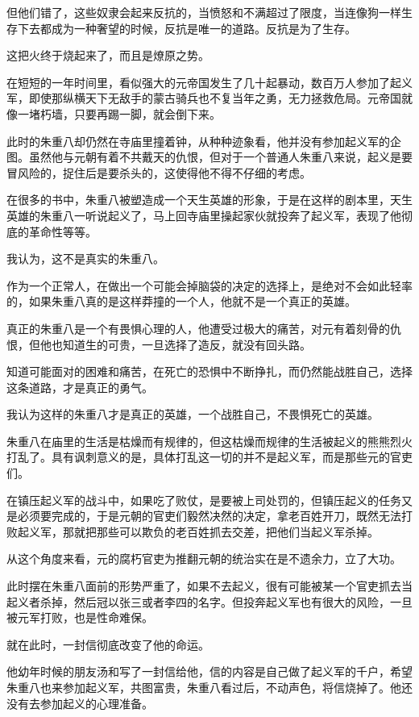 \begin{multicols}{\theparacolNo}
		但他们错了，这些奴隶会起来反抗的，当愤怒和不满超过了限度，当连像狗一样生存下去都成为一种奢望的时候，反抗是唯一的道路。反抗是为了生存。

		这把火终于烧起来了，而且是燎原之势。

		在短短的一年时间里，看似强大的元帝国发生了几十起暴动，数百万人参加了起义军，即使那纵横天下无敌手的蒙古骑兵也不复当年之勇，无力拯救危局。元帝国就像一堵朽墙，只要再踢一脚，就会倒下来。

		此时的朱重八却仍然在寺庙里撞着钟，从种种迹象看，他并没有参加起义军的企图。虽然他与元朝有着不共戴天的仇恨，但对于一个普通人朱重八来说，起义是要冒风险的，捉住后是要杀头的，这使得他不得不仔细的考虑。

		在很多的书中，朱重八被塑造成一个天生英雄的形象，于是在这样的剧本里，天生英雄的朱重八一听说起义了，马上回寺庙里操起家伙就投奔了起义军，表现了他彻底的革命性等等。

		我认为，这不是真实的朱重八。

		作为一个正常人，在做出一个可能会掉脑袋的决定的选择上，是绝对不会如此轻率的，如果朱重八真的是这样莽撞的一个人，他就不是一个真正的英雄。

		真正的朱重八是一个有畏惧心理的人，他遭受过极大的痛苦，对元有着刻骨的仇恨，但他也知道生的可贵，一旦选择了造反，就没有回头路。

		知道可能面对的困难和痛苦，在死亡的恐惧中不断挣扎，而仍然能战胜自己，选择这条道路，才是真正的勇气。

		我认为这样的朱重八才是真正的英雄，一个战胜自己，不畏惧死亡的英雄。

		朱重八在庙里的生活是枯燥而有规律的，但这枯燥而规律的生活被起义的熊熊烈火打乱了。具有讽刺意义的是，具体打乱这一切的并不是起义军，而是那些元的官吏们。

		在镇压起义军的战斗中，如果吃了败仗，是要被上司处罚的，但镇压起义的任务又是必须要完成的，于是元朝的官吏们毅然决然的决定，拿老百姓开刀，既然无法打败起义军，那就把那些可以欺负的老百姓抓去交差，把他们当起义军杀掉。

		从这个角度来看，元的腐朽官吏为推翻元朝的统治实在是不遗余力，立了大功。

		此时摆在朱重八面前的形势严重了，如果不去起义，很有可能被某一个官吏抓去当起义者杀掉，然后冠以张三或者李四的名字。但投奔起义军也有很大的风险，一旦被元军打败，也是性命难保。

		就在此时，一封信彻底改变了他的命运。

		他幼年时候的朋友汤和写了一封信给他，信的内容是自己做了起义军的千户，希望朱重八也来参加起义军，共图富贵，朱重八看过后，不动声色，将信烧掉了。他还没有去参加起义的心理准备。


\end{multicols}

